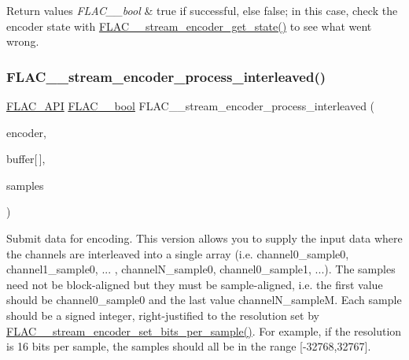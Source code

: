 \begin{DoxyRetVals}{Return values}
{\em F\+L\+A\+C\+\_\+\+\_\+bool} & {\ttfamily true} if successful, else {\ttfamily false}; in this case, check the encoder state with \hyperlink{group__flac__stream__encoder_gaff7284e55f01b59ed8f03317df510992}{F\+L\+A\+C\+\_\+\+\_\+stream\+\_\+encoder\+\_\+get\+\_\+state()} to see what went wrong. \\
\hline
\end{DoxyRetVals}
\mbox{\label{group__flac__stream__encoder_ga67c2ff5b23b945180797de420b1f27c0}} 
\subsubsection{\texorpdfstring{F\+L\+A\+C\+\_\+\+\_\+stream\+\_\+encoder\+\_\+process\+\_\+interleaved()}{FLAC\_\_stream\_encoder\_process\_interleaved()}}
{\footnotesize\ttfamily \hyperlink{group__flac__export_ga56ca07df8a23310707732b1c0007d6f5}{F\+L\+A\+C\+\_\+\+A\+PI} \hyperlink{ordinals_8h_a95103469f1cbd78b8cf250194985b34e}{F\+L\+A\+C\+\_\+\+\_\+bool} F\+L\+A\+C\+\_\+\+\_\+stream\+\_\+encoder\+\_\+process\+\_\+interleaved (\begin{DoxyParamCaption}\item[{\hyperlink{struct_f_l_a_c_____stream_encoder}{F\+L\+A\+C\+\_\+\+\_\+\+Stream\+Encoder} $\ast$}]{encoder,  }\item[{\hyperlink{zconf_8h_a2c212835823e3c54a8ab6d95c652660e}{const} \hyperlink{ordinals_8h_a33fd77bfe6d685541a0c034a75deccdc}{F\+L\+A\+C\+\_\+\+\_\+int32}}]{buffer\mbox{[}$\,$\mbox{]},  }\item[{unsigned}]{samples }\end{DoxyParamCaption})}

Submit data for encoding. This version allows you to supply the input data where the channels are interleaved into a single array (i.\+e. channel0\+\_\+sample0, channel1\+\_\+sample0, ... , channel\+N\+\_\+sample0, channel0\+\_\+sample1, ...). The samples need not be block-\/aligned but they must be sample-\/aligned, i.\+e. the first value should be channel0\+\_\+sample0 and the last value channel\+N\+\_\+sampleM. Each sample should be a signed integer, right-\/justified to the resolution set by \hyperlink{group__flac__stream__encoder_ga5a21cf7f86a81df6ba72714a6b917aa3}{F\+L\+A\+C\+\_\+\+\_\+stream\+\_\+encoder\+\_\+set\+\_\+bits\+\_\+per\+\_\+sample()}. For example, if the resolution is 16 bits per sample, the samples should all be in the range \mbox{[}-\/32768,32767\mbox{]}.

